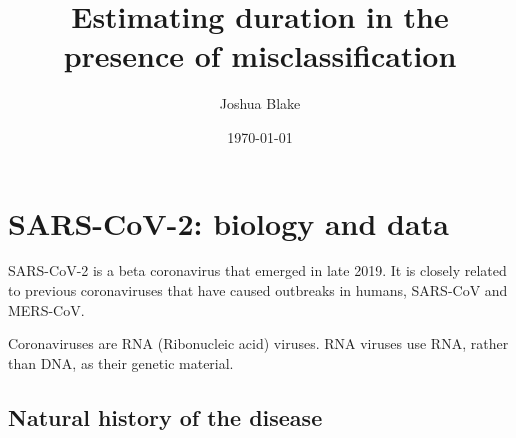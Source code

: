 \documentclass[thesis.tex]{subfiles}
\title{Estimating duration in the presence of misclassification}
\author{Joshua Blake}
\date{\today}
\begin{document}
\ifSubfilesClassLoaded{
  \setcounter{chapter}{1}
}

\chapter{SARS-CoV-2: biology and data} \label{biology-data}



SARS-CoV-2 is a beta coronavirus that emerged in late 2019.
It is closely related to previous coronaviruses that have caused outbreaks in humans, SARS-CoV and MERS-CoV.

Coronaviruses are RNA (Ribonucleic acid) viruses.
RNA viruses use RNA, rather than DNA, as their genetic material.

\section{Natural history of the disease} \label{biology-data:sec:natural-history}
\end{document}
